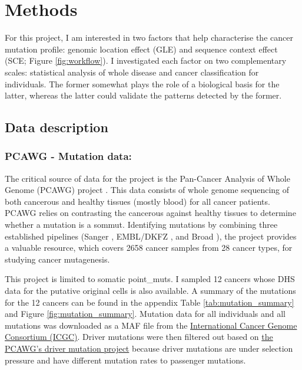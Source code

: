 \chapter{Methods}\label{methods}

For this project, I am interested in two factors that help characterise the cancer mutation profile: genomic location effect (GLE) and sequence context effect (SCE; Figure \ref{fig:workflow}). I investigated each factor on two complementary scales: statistical analysis of whole disease and cancer classification for individuals. The former somewhat plays the role of a biological basis for the latter, whereas the latter could validate the patterns detected by the former.



\section{Data description}
\subsection{PCAWG - Mutation data:} 
The critical source of data for the project is the Pan-Cancer Analysis of Whole Genome (PCAWG) project \citep{Campbell2020}. This data consists of whole genome sequencing of both cancerous and healthy tissues (mostly blood) for all cancer patients. PCAWG relies on contrasting the cancerous against healthy tissues to determine whether a mutation is a \gls{sommut}. Identifying mutations by combining three established pipelines (Sanger \citep{Jones2016CgpCaVEManWrapper:Data}, EMBL/DKFZ \citep{Rimmer2014IntegratingApplications}, and Broad \citep{Cibulskis2013SensitiveSamples}), the project provides a valuable resource, which covers 2658 cancer samples from 28 cancer types, for studying cancer mutagenesis.

This project is limited to somatic \glspl{point_mut}. I sampled 12 cancers whose DHS data for the putative original cells is also available. A summary of the mutations for the 12 cancers can be found in the appendix Table \ref{tab:mutation_summary} and Figure \ref{fig:mutation_summary}. Mutation data for all individuals and all mutations was downloaded as a MAF file from the \href{https://dcc.icgc.org/releases/PCAWG/consensus_snv_indel}{International Cancer Genome Consortium (ICGC)}. Driver mutations were then filtered out based on \href{https://dcc.icgc.org/releases/PCAWG/driver_mutations}{the PCAWG's driver mutation project} because driver mutations are under selection pressure and have different mutation rates to passenger mutations. 

